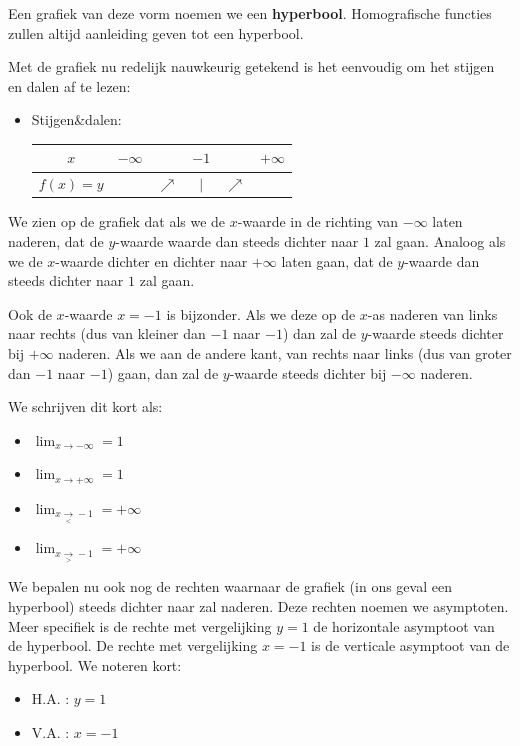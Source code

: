 \documentclass[12pt]{article}
\begin{document}
\begin{theorie}
Een grafiek van deze vorm noemen we een {\bf hyperbool}. Homografische functies zullen altijd aanleiding geven tot een hyperbool.

Met de grafiek nu redelijk nauwkeurig getekend is het eenvoudig om het stijgen en dalen af te lezen:

\begin{itemize}
  \item Stijgen\&dalen:
  \begin{center}
    \begin{tabular}{c|ccccc}
      $x$ & $-\infty$ & & $-1$ & & $+\infty$\\
      \hline
      $f(x)=y$ & & $\nearrow$ & $|$ & $\nearrow$ &
    \end{tabular}
  \end{center}
\end{itemize}

We zien op de grafiek dat als we de $x$-waarde in de richting van $-\infty$ laten naderen, dat de $y$-waarde waarde dan steeds dichter naar $1$ zal gaan. Analoog als we de $x$-waarde dichter en dichter naar $+\infty$ laten gaan, dat de $y$-waarde dan steeds dichter naar $1$ zal gaan.

Ook de $x$-waarde $x=-1$ is bijzonder. Als we deze op de $x$-as naderen van links naar rechts (dus van kleiner dan $-1$ naar $-1$) dan zal de $y$-waarde steeds dichter bij $+\infty$ naderen. Als we aan de andere kant, van rechts naar links (dus van groter dan $-1$ naar $-1$) gaan, dan zal de $y$-waarde steeds dichter bij $-\infty$ naderen.

We schrijven dit kort als:

\begin{itemize}
  \item $\displaystyle\lim_{x\to -\infty}=1$
  \item $\displaystyle\lim_{x\to +\infty}=1$
  \item $\displaystyle\lim_{x\underset{<}{\to} -1}=+\infty$
  \item $\displaystyle\lim_{x\underset{>}{\to} -1}=+\infty$
\end{itemize}

We bepalen nu ook nog de rechten waarnaar de grafiek (in ons geval een hyperbool) steeds dichter naar zal naderen. Deze rechten noemen we asymptoten. Meer specifiek is de rechte met vergelijking $y=1$ de horizontale asymptoot van de hyperbool. De rechte met vergelijking $x=-1$ is de verticale asymptoot van de hyperbool. We noteren kort:

\begin{itemize}
  \item H.A. : $y=1$
  \item V.A. : $x=-1$
\end{itemize}


\end{theorie}
\end{document}
